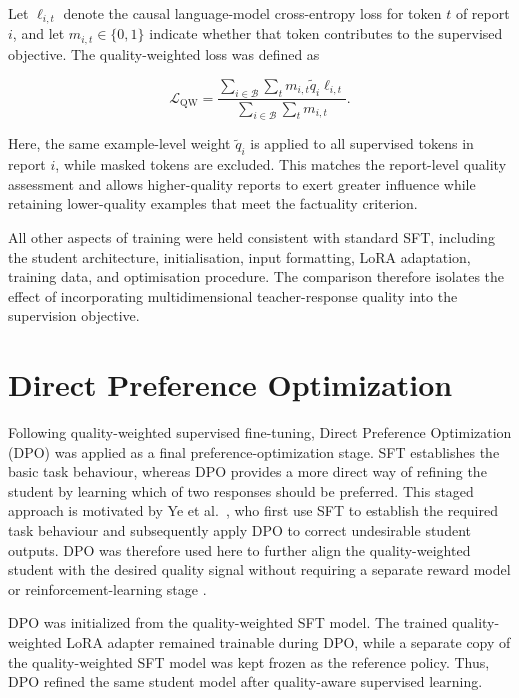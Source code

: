 \documentclass[ %
                    author={Aman Kumar Singh},
                supervisor={Dr. Edwin Simpson},
                    degree={MSc},
                     title={Quality-Aware Knowledge Distillation of Large Language Models for Efficient Personalised Clinical Report Generation},
                  subtitle={},
                      type={},
                      year={2021}]{dissertation}
\begin{document}
Let $\ell_{i,t}$ denote the causal language-model cross-entropy loss for
token $t$ of report $i$, and let $m_{i,t}\in\{0,1\}$ indicate whether that
token contributes to the supervised objective. The quality-weighted loss
was defined as

\begin{equation}
\mathcal{L}_{\mathrm{QW}}
=
\frac{
\displaystyle
\sum_{i\in\mathcal{B}}\sum_t
m_{i,t}\tilde q_i\ell_{i,t}}
{
\displaystyle
\sum_{i\in\mathcal{B}}\sum_t m_{i,t}
}.
\label{eq:quality_weighted_loss}
\end{equation}

Here, the same example-level weight $\tilde q_i$ is applied to all
supervised tokens in report $i$, while masked tokens are excluded. This
matches the report-level quality assessment and allows higher-quality
reports to exert greater influence while retaining lower-quality examples
that meet the factuality criterion.

All other aspects of training were held consistent with standard SFT,
including the student architecture, initialisation, input formatting, LoRA
adaptation, training data, and optimisation procedure. The comparison
therefore isolates the effect of incorporating multidimensional
teacher-response quality into the supervision objective.
\section{Direct Preference Optimization}
\label{sec:dpo}

Following quality-weighted supervised fine-tuning, Direct Preference
Optimization (DPO) was applied as a final preference-optimization stage.
SFT establishes the basic task behaviour, whereas DPO provides a more direct
way of refining the student by learning which of two responses should be
preferred. This staged approach is motivated by Ye et al.~\cite{ye_teaching_2026},
who first use SFT to establish the required task behaviour and subsequently
apply DPO to correct undesirable student outputs. DPO was therefore used
here to further align the quality-weighted student with the desired
quality signal without requiring a separate reward model or
reinforcement-learning stage \cite{rafailov_direct_2024}.

DPO was initialized from the quality-weighted SFT model. The trained
quality-weighted LoRA adapter remained trainable during DPO, while a
separate copy of the quality-weighted SFT model was kept frozen as the
reference policy. Thus, DPO refined the same student model after
quality-aware supervised learning.
\end{document}
